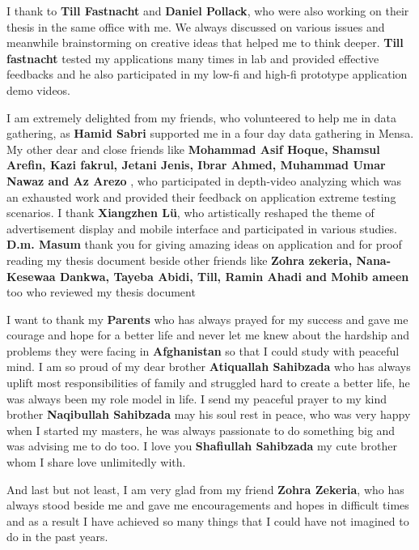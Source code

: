 \begin{acknowledgements}
I thank to \textbf{Till Fastnacht} and \textbf{Daniel Pollack}, who were also working on their thesis in the same office with me. We always discussed on various issues and meanwhile brainstorming on creative ideas that helped me to think deeper. \textbf{Till fastnacht} tested my applications many times in lab and provided effective feedbacks and he also participated in my low-fi and high-fi prototype application demo videos. 

I am extremely delighted from my friends, who volunteered to help me in data gathering, as \textbf{Hamid Sabri} supported me in a four day data gathering in Mensa. My other dear and close friends like \textbf{Mohammad Asif Hoque, Shamsul Arefin, Kazi fakrul, Jetani Jenis, Ibrar Ahmed, Muhammad Umar Nawaz and Az Arezo }, who participated in depth-video analyzing which was an exhausted work and provided their feedback on application extreme testing scenarios. I thank \textbf{Xiangzhen Lü}, who artistically reshaped the theme of advertisement display and mobile interface and participated in various studies. \textbf{D.m. Masum} thank you for giving amazing ideas on application and for proof reading my thesis document beside other friends like \textbf{Zohra zekeria, Nana-Kesewaa Dankwa, Tayeba Abidi, Till, Ramin Ahadi and Mohib ameen} too who reviewed my thesis document

I want to thank my \textbf{Parents} who has always prayed for my success and gave me courage and hope for a better life and never let me knew about the hardship and problems they were facing in \textbf{Afghanistan} so that I could study with peaceful mind. I am so proud of my dear brother \textbf{Atiquallah Sahibzada} who has always uplift most responsibilities of family and struggled hard to create a better life, he was always been my role model in life. I send my peaceful prayer to my kind brother \textbf{Naqibullah Sahibzada} may his soul rest in peace, who was very happy when I started my masters, he was always passionate to do something big and was advising me to do too. I love you \textbf{Shafiullah Sahibzada} my cute brother whom I share love unlimitedly with.

And last but not least, I am very glad from my friend \textbf{Zohra Zekeria}, who has always stood beside me and gave me encouragements and hopes in difficult times and as a result I have achieved so many things that I could have not imagined to do in the past years. 


\end{acknowledgements}
